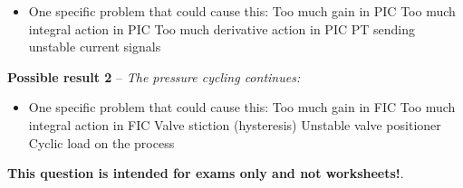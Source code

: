 \begin{itemize}
\item{} One specific problem that could cause this: 
\itemitem{} Too much gain in PIC
\itemitem{} Too much integral action in PIC
\itemitem{} Too much derivative action in PIC
\itemitem{} PT sending unstable current signals
\end{itemize}

\noindent
{\bf Possible result 2} -- {\it The pressure cycling continues:}

\begin{itemize}
\item{} One specific problem that could cause this:
\itemitem{} Too much gain in FIC
\itemitem{} Too much integral action in FIC
\itemitem{} Valve stiction (hysteresis)
\itemitem{} Unstable valve positioner
\itemitem{} Cyclic load on the process
\end{itemize}









{\bf This question is intended for exams only and not worksheets!}.



